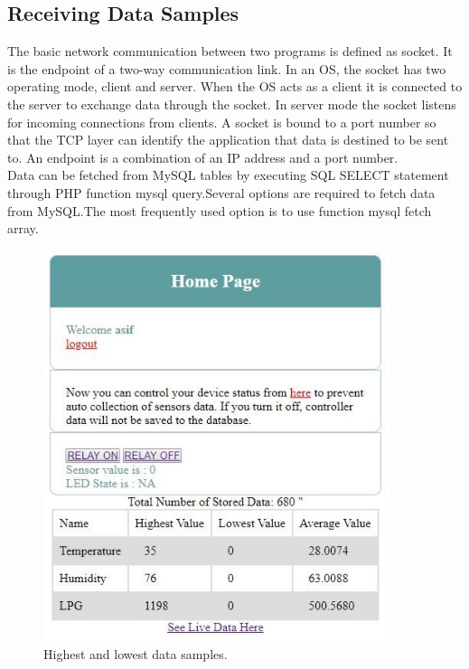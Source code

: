 \subsection{Receiving Data Samples}
The basic network communication between two programs is defined as socket. It is the endpoint of a two-way communication link. In an OS, the socket has two operating mode, client and server. When the OS acts as a client it is connected to the server to exchange data through the socket. In server mode the socket listens for incoming connections from clients. A socket is bound to a port number so that the TCP layer can identify the application that data is destined to be sent to. An endpoint is a combination of an IP address and a port number.\\
Data can be fetched from MySQL tables by executing SQL SELECT statement through PHP function mysql query.Several options are required to fetch data from MySQL.The most frequently used option is to use function mysql fetch array.
\begin{figure}[H]
  \centering
  \includegraphics[width=4in]{38}
  \caption{Highest and lowest data samples. }\label{fig38}
\end{figure}



